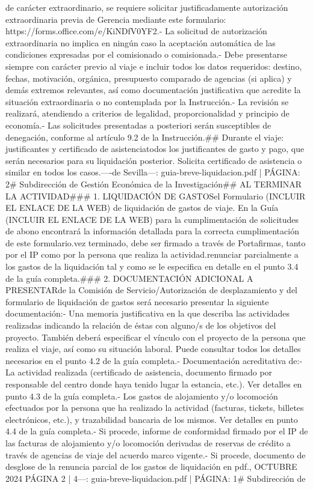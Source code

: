 \documentclass{article}
\begin{document}
\begin{itemize}
de carácter extraordinario, se requiere solicitar justificadamente autorización extraordinaria previa de Gerencia mediante este formulario: https://forms.office.com/e/KiNDfV0YF2.\n\n- La solicitud de autorización extraordinaria no implica en ningún caso la aceptación automática de las condiciones expresadas por el comisionado o comisionada.\n- Debe presentarse siempre con carácter previo al viaje e incluir todos los datos requeridos: destino, fechas, motivación, orgánica, presupuesto comparado de agencias (si aplica) y demás extremos relevantes, así como documentación justificativa que acredite la situación extraordinaria o no contemplada por la Instrucción.\n- La revisión se realizará, atendiendo a criterios de legalidad, proporcionalidad y principio de economía.\n- Las solicitudes presentadas a posteriori serán susceptibles de denegación, conforme al artículo 9.2 de la Instrucción.\n\n## Durante el viaje: justificantes y certificado de asistencia\n\nGuarda todos los justificantes de gasto y pago, que serán necesarios para su liquidación posterior. Solicita certificado de asistencia o similar en todos los casos.\n\n----\n\nGerencia\nUniversidad de Sevilla\n\n---\n\nFUENTE: guia-breve-liquidacion.pdf | PÁGINA: 2\n# Subdirección de Gestión Económica de la Investigación\n\n## AL TERMINAR LA ACTIVIDAD\n\n### 1. LIQUIDACIÓN DE GASTOS\n\nRellene el Formulario (INCLUIR EL ENLACE DE LA WEB) de liquidación de gastos de viaje. En la Guía (INCLUIR EL ENLACE DE LA WEB) para la cumplimentación de solicitudes de abono encontrará la información detallada para la correcta cumplimentación de este formulario.\n\nUna vez terminado, debe ser firmado a través de Portafirmas, tanto por el IP como por la persona que realiza la actividad.\n{} renunciar parcialmente a los gastos de la liquidación tal y como se le especifica en detalle en el punto 3.4 de la guía completa.\n\n### 2. DOCUMENTACIÓN ADICIONAL A PRESENTAR\n{} de la Comisión de Servicio/Autorización de desplazamiento y del formulario de liquidación de gastos será necesario presentar la siguiente documentación:\n\n- Una memoria justificativa en la que describa las actividades realizadas indicando la relación de éstas con alguno/s de los objetivos del proyecto. También deberá especificar el vínculo con el proyecto de la persona que realiza el viaje, así como su situación laboral. Puede consultar todos los detalles necesarios en el punto 4.2 de la guía completa.\n\n- Documentación acreditativa de:\n- La actividad realizada (certificado de asistencia, documento firmado por responsable del centro donde haya tenido lugar la estancia, etc.). Ver detalles en punto 4.3 de la guía completa.\n- Los gastos de alojamiento y/o locomoción efectuados por la persona que ha realizado la actividad (facturas, tickets, billetes electrónicos, etc.), y trazabilidad bancaria de los mismos. Ver detalles en punto 4.4 de la guía completa.\n- Si procede, informe de conformidad firmado por el IP de las facturas de alojamiento y/o locomoción derivadas de reservas de crédito a través de agencias de viaje del acuerdo marco vigente.\n- Si procede, documento de desglose de la renuncia parcial de los gastos de liquidación en pdf.\n{}, OCTUBRE 2024    PÁGINA 2 | 4\n\n---\n\nFUENTE: guia-breve-liquidacion.pdf | PÁGINA: 1\n# Subdirección de 
\end{itemize}
\end{document}
